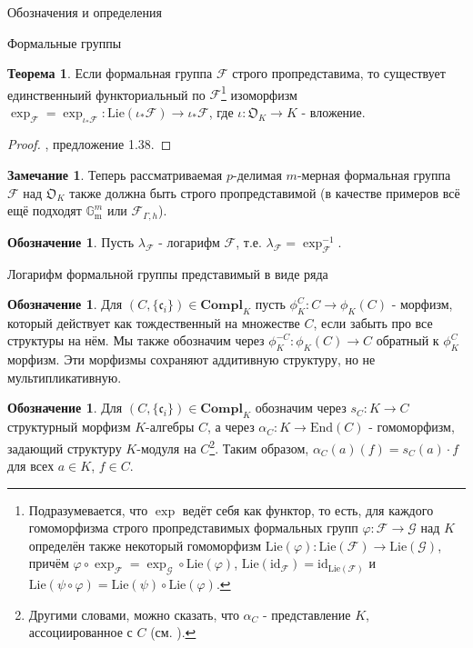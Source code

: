 \documentclass[a4paper,14pt]{extarticle}
\theoremstyle{definition}
\newtheorem{denotation}[definition]{Обозначение}
\newtheorem{theorem}{Теорема}[section]
\newtheorem{remark}{Замечание}[section]
\newcommand{\id}{\mathrm{id}}
\newcommand{\End}[1]{\mathrm{End}\left(#1\right)}
\newcommand{\Compl}[1]{\mathbf{Compl}_{#1}}
\newcommand{\forget}[1]{\phi_{#1}}
\newcommand{\Lie}[1]{\mathrm{Lie}\left(#1\right)}
\newcommand{\bG}{\mathbb{G}}
\newcommand{\fO}{\mathfrak{O}}
\newcommand{\fc}{\mathfrak{c}}
\newcommand{\sF}{\mathscr{F}}
\newcommand{\sG}{\mathscr{G}}
\newcommand{\Gm}{\bG_{\mathrm{m}}}
\begin{document}
\begin{section}{Обозначения и определения}
\begin{subsection}{Формальные группы}
\begin{theorem}\label{theorem:3.3:exp_existence}
    Если формальная группа $\sF$ строго пропредставима, то существует единственныий функториальный по $\sF$\footnote{
        Подразумевается, что $\exp$ ведёт себя как функтор, то есть, для каждого гомоморфизма строго пропредставимых формальных групп ${ \varphi : \sF \rightarrow \sG }$ над $K$ определён также некоторый гомоморфизм ${ \Lie{\varphi} : \Lie{\sF} \rightarrow \Lie{\sG} }$, причём ${ \varphi \circ \exp_\sF = \exp_\sG \circ \Lie{\varphi} }$, ${ \Lie{\id_\sF} = \id_{\Lie{\sF}} }$ и ${ \Lie{\psi \circ \varphi} = \Lie{\psi} \circ \Lie{\varphi} }$.
    } изоморфизм ${ \exp_\sF = \exp_{\iota_* \sF} : \Lie{\iota_* \sF} \rightarrow \iota_* \sF }$, где ${ \iota : \fO_K \rightarrow K }$ - вложение.
\end{theorem}
\begin{proof}
    \cite{ZinkLectures}, предложение 1.38.
\end{proof}

\begin{remark}\label{remark:3.after_exp_existence:sF}
   Теперь рассматриваемая $p$-делимая $m$-мерная формальная группа $\sF$ над $\fO_K$ также должна быть строго пропредставимой (в качестве примеров всё ещё подходят $\Gm^m$ или $\sF_{\Gamma, h}$).
\end{remark}

\begin{denotation}\label{denote:3.after_exp_existence:log_sF}
    Пусть $\lambda_\sF$ - логарифм $\sF$, т.е. ${ \lambda_\sF = \exp_\sF^{-1} }$.
\end{denotation}

\end{subsection}

\begin{subsection}{Логарифм формальной группы представимый в виде ряда}

\begin{denotation}
    Для ${ (C, \{ \fc_i \}) \in \Compl{K} }$ пусть ${ \forget{K}^C : C \rightarrow \forget{K}(C) }$ - морфизм, который действует как тождественный на множестве $C$, если забыть про все структуры на нём. Мы также обозначим через ${ \forget{K}^{-C} : \forget{K}(C) \rightarrow C }$ обратный к $\forget{K}^C$ морфизм. Эти морфизмы сохраняют аддитивную структуру, но не мультипликативную.
\end{denotation}

\begin{denotation}
    Для ${ (C, \{ \fc_i \}) \in \Compl{K} }$ обозначим через ${ s_C : K \rightarrow C }$ структурный морфизм $K$-алгебры $C$, а через ${ \alpha_C : K \rightarrow \End{C} }$ - гомоморфизм, задающий структуру $K$-модуля на $C$\footnote{
        Другими словами, можно сказать, что $\alpha_C$ - представление $K$, ассоциированное с $C$ (см. \cite{Passman}).
    }. Таким образом, ${ \alpha_C(a)(f) = s_C(a) \cdot f }$ для всех ${ a \in K }$, ${ f \in C }$.


\end{denotation}
\end{subsection}
\end{section}
\end{document}
